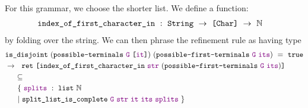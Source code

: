    For this grammar, we choose the shorter list.  We define a function:
\begin{align*}
&\texttt{index\_of\_first\_character\_in}~:~\texttt{String}~\to~\texttt{[}\texttt{Char}\texttt{]}~\to~\mathbb{N}
\end{align*}
   by folding over the string.  We can then phrase the refinement rule as having type
\begin{align*}
&\fname{is\_disjoint}~(\fname{possible-terminals}~\farg{G}~\valuelist{\farg{it}})~(\fname{possible-first-terminals}~\farg{G}~\farg{its})~=~\true \\
&\to~~\fname{ret}~\valuelist{\fname{index\_of\_first\_character\_in}~\farg{str}~(\fname{possible-first-terminals}~\farg{G}~\farg{its})} \\
&\phantom{\to~}\subseteq \\
&\ndcompfor[\phantom{\to~~}]{\farg{it}}{\farg{its}}
\end{align*}
     \label{sec:reflective-comp-first-mention}%
    \newcommand{\refAtReflectiveCompLoc}{at the end of \autoref{sec:reflective-comp-first-mention}}
%
%
%
%
%  
%  
